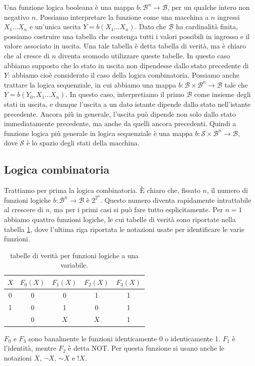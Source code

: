 \documentclass[a4paper, 11pt]{article}
\newcommand{\B}{\mathcal{B}}
\begin{document}
Una funzione logica booleana è una mappa $b\colon\B^n\to\B$, per un qualche intero non negativo $n$. Possiamo interpretare la funzione come una macchina a $n$ ingressi $X_1\dots X_n$ e un'unica uscita $Y=b(X_1\dots X_n)$. Dato che $\B$ ha cardinalità finita, possiamo costruire una tabella che contenga tutti i valori possibili in ingresso e il valore associato in uscita. Una tale tabella è detta tabella di verità, ma è chiaro che al cresce di $n$ diventa scomodo utilizzare queste tabelle. In questo caso abbiamo supposto che lo stato in uscita non dipendesse dallo stato precedente di $Y$: abbiamo cioè considerato il caso della logica combinatoria. Possiamo anche trattare la logica sequenziale, in cui abbiamo una mappa ${b}\colon\B\times\B^n\to\B$ tale che $Y={b}(Y_0,X_1\dots X_n)$. In questo caso, interpretiamo il primo $\B$ come insieme degli stati in uscita, e dunque l'uscita a un dato istante dipende dallo stato nell'istante precedente. Ancora più in generale, l'uscita può dipende non solo dallo stato immediatamente precedente, ma anche da quelli ancora precedenti. Quindi a funzione logica più generale in logica sequenziale è una mappa $b\colon\mathcal{S}\times\B^n\to \B$, dove $\mathcal{S}$ è lo spazio degli stati della macchina.
\subsection{Logica combinatoria}
Trattiamo per prima la logica combinatoria. \`{E} chiaro che, fissato $n$, il numero di funzioni logiche $b\colon\B^n\to\B$ è
$2^{2^n}$. Questo numero diventa rapidamente intrattabile al crescere di $n$, ma per i primi casi si può fare tutto esplicitamente. Per $n=1$ abbiamo quattro funzioni logiche, le cui tabelle di verità sono riportate nella tabella \ref{tab:ver1}, dove l'ultima riga riportata le notazioni usate per identificare le varie funzioni.
\begin{table}[h!]
	\centering
	\begin{tabular}{c | c c c c}
		$X$&$F_0(X)$&$F_1(X)$&$F_2(X)$&$F_3(X)$\\\hline
		0&0&0&1&1\\1&0&1&0&1\\\hline&0&$X$&$\overline{X}$&1
	\end{tabular}
	\caption{tabelle di verità per funzioni logiche a una variabile.}
	\label{tab:ver1}
\end{table}
$F_0$ e $F_3$ sono banalmente le funzioni identicamente 0 o identicamente 1. $F_1$ è l'identità, mentre $F_2$ è detta \textsf{NOT}. Per questa funzione si usano anche le notazioni $\overline{X}$, $\neg X$, $\sim$$X$ e $!X$.
\end{document}
